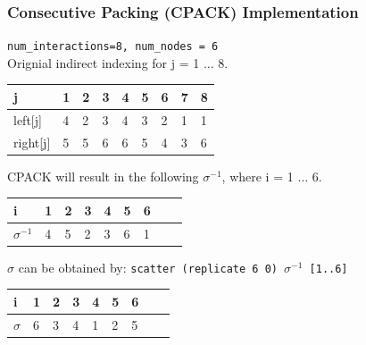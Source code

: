 \documentclass{beamer}
\begin{document}
\begin{frame}[fragile,t]
  \frametitle{Consecutive Packing (CPACK) Implementation}

{\tt num\_interactions=8, num\_nodes = 6}\\
Orignial indirect indexing for j = 1 $\ldots$ 8.\smallskip
 
\begin{tabular}{ | l | l | l | l | l | l | l | l | l |}
  j       & 1 & 2 & 3 & 4 & 5 & 6 & 7 & 8\\\hline
  left[j] & 4 & 2 & 3 & 4 & 3 & 2 & 1 & 1\\
  right[j]& 5 & 5 & 6 & 6 & 5 & 4 & 3 & 6\\\hline
\end{tabular}
\bigskip

CPACK will result in the following $\sigma^{-1}$, where i = 1 $\ldots$ 6.\pause\smallskip

\begin{tabular}{ | l | l | l | l | l | l | l | l | l |}
  i             & 1 & 2 & 3 & 4 & 5 & 6\\\hline
  $\sigma^{-1}$ & 4 & 5 & 2 & 3 & 6 & 1\\\hline
\end{tabular}

\bigskip

$\sigma$ can be obtained by: {\tt scatter (replicate 6 0) $\sigma^{-1}$ [1..6]}\\\pause\smallskip

\begin{tabular}{ | l | l | l | l | l | l | l | l | l |}
  i         & 1 & 2 & 3 & 4 & 5 & 6\\\hline
  $\sigma $ & 6 & 3 & 4 & 1 & 2 & 5\\\hline
\end{tabular}

\end{frame}
\end{document}
